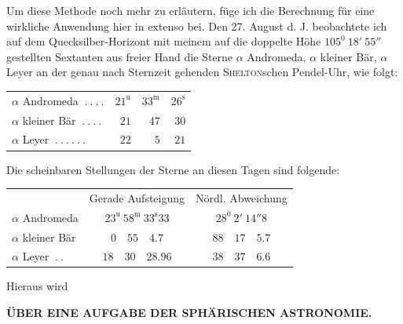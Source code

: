 Um diese Methode noch mehr zu erläutern, füge ich die Berechnung für
eine wirkliche Anwendung hier in extenso bei. Den 27. August d. J. beobachtete
ich auf dem Quecksilber-Horizont mit meinem auf die doppelte Höhe
$105^0\ 18'\ 55''$ gestellten Sextanten aus freier Hand die Sterne $\alpha$ Andromeda,
$\alpha$ kleiner Bär, $\alpha$ Leyer an der genau nach Sternzeit gehenden \textsc{Shelton}schen
Pendel-Uhr, wie folgt:
\begin{center}
\begin{tabular}{lrrr}
$\alpha$ Andromeda $\ .\ .\ .\ .$&$21^{\mathrm u}$&$33^{\mathrm m}$&$26^{\mathrm s}$\\
$\alpha$ kleiner Bär $\ .\ .\ .\ .$&$21$&$47$&$30$\\
$\alpha$ Leyer $\ .\ .\ .\ .\ .\ .$&$22$&$5$&$21$
\end{tabular}
\end{center}
Die scheinbaren Stellungen der Sterne an diesen Tagen sind folgende:
\begin{center}
\small
\begin{tabular}{lcc}
&Gerade Aufsteigung&Nördl. Abweichung\\
$\alpha$ Andromeda&$23^{\mathrm u}\ 58^{\mathrm m}\ 33^{\mathrm s}33$&$28^0\ 2'\ 14''8$\\
$\alpha$ kleiner Bär&$0\quad55\quad4.7$&$88\quad17\quad5.7$\\
$\alpha$ Leyer $\ .\ .$&$18\quad30\quad28.96$&$38\quad37\quad6.6$
\end{tabular}
\end{center}
Hieraus wird
\par\clearpage
\endgroup
\begingroup
\pagestyle{empty}
\newcommand{\GaussVIGathering}[2]{%
  \fancypagestyle{gaussVIGathering}{%
    \fancyhf{}%
    \renewcommand{\headrulewidth}{0pt}%
    \renewcommand{\footrulewidth}{0pt}%
    \fancyfoot[C]{\makebox[\textwidth][l]{%
      \hspace*{.025\textwidth}{\footnotesize\bfseries #1}\hfill
      {\normalsize\bfseries\textls[90]{#2}}\hspace*{.18\textwidth}}}%
  }%
  \thispagestyle{gaussVIGathering}%
}
\thispagestyle{empty}
\noindent{}%
\makebox[12mm][l]{}%
\parbox[t]{\dimexpr\linewidth-24mm\relax}{\centering\fontsize{8.5}{10}\selectfont\bfseries ÜBER EINE AUFGABE DER SPHÄRISCHEN ASTRONOMIE.\par}%
\par\nobreak\medskip
